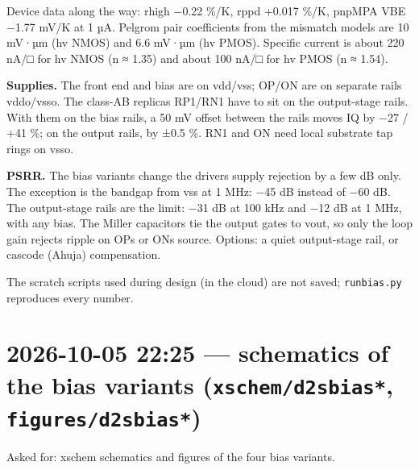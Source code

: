 \documentclass[11pt,a4paper]{article}
\renewcommand{\_}{\textunderscore\hspace{0pt}}
\begin{document}
Device data along the way: rhigh −0.22 \%/K, rppd
+0.017 \%/K, pnpMPA V\_BE −1.77 mV/K at 1 µA.
Pelgrom pair coefficients from the mismatch models
are 10 mV·µm (hv NMOS) and 6.6 mV·µm (hv PMOS).
Specific current is about 220 nA/□ for hv NMOS (n
≈ 1.35) and about 100 nA/□ for hv PMOS (n ≈ 1.54).

\textbf{Supplies.} The front end and bias are on
vdd/vss; OP/ON are on separate rails vddo/vsso.
The class-AB replicas RP1/RN1 have to sit on the
output-stage rails. With them on the bias rails, a
50 mV offset between the rails moves I\_Q by −27 /
+41 \%; on the output rails, by ±0.5 \%. RN1 and
ON need local substrate tap rings on vsso.

\textbf{PSRR.} The bias variants change the
driver\textquotesingle s supply rejection by a few
dB only. The exception is the bandgap from vss at
1 MHz: −45 dB instead of −60 dB. The output-stage
rails are the limit: −31 dB at 100 kHz and −12 dB
at 1 MHz, with any bias. The Miller capacitors tie
the output gates to vout, so only the loop gain
rejects ripple on OP\textquotesingle s or
ON\textquotesingle s source. Options: a quiet
output-stage rail, or cascode (Ahuja)
compensation.

The scratch scripts used during design (in the
cloud) are not saved; \texttt{run\_bias.py}
reproduces every number.

\hypertarget{2026-10-05-2225--schematics-of-the-bias-variants-xschemd2s_bias_-figuresd2s_bias_}{%
\section{\texorpdfstring{2026-10-05 22:25 ---
schematics of the bias variants
(\texttt{xschem/d2s\_bias\_*},
\texttt{figures/d2s\_bias\_*})}{2026-10-05 22:25 --- schematics of the bias variants (xschem/d2s\_bias\_*, figures/d2s\_bias\_*)}}\label{2026-10-05-2225--schematics-of-the-bias-variants-xschemd2s_bias_-figuresd2s_bias_}}

Asked for: xschem schematics and figures of the
four bias variants.
\end{document}
